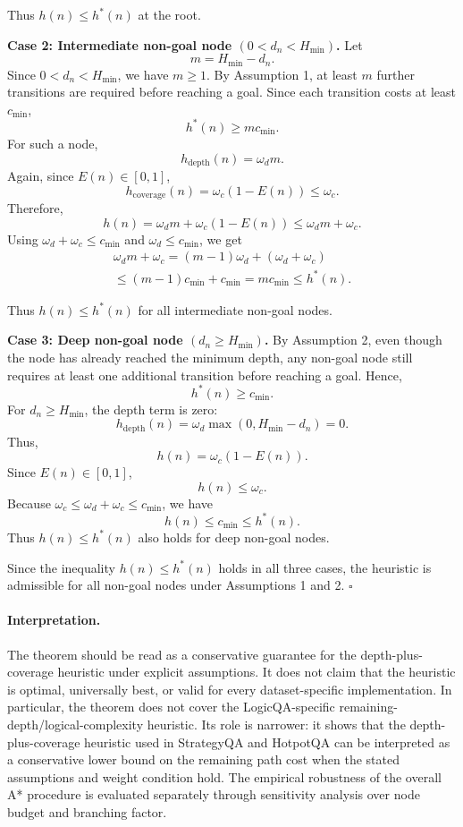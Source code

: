 \documentclass[10pt]{article}
\begin{document}
Thus \(h(n)\leq h^*(n)\) at the root.

\textbf{Case 2: Intermediate non-goal node \((0<d_n<H_{\min})\).}
Let
\[
m = H_{\min}-d_n.
\]
Since \(0<d_n<H_{\min}\), we have \(m\geq 1\). By Assumption 1, at least \(m\) further transitions are required before reaching a goal. Since each transition costs at least \(c_{\min}\),
\[
h^*(n) \geq m c_{\min}.
\]
For such a node,
\[
h_{\mathrm{depth}}(n)=\omega_d m.
\]
Again, since \(E(n)\in[0,1]\),
\[
h_{\mathrm{coverage}}(n)=\omega_c(1-E(n))\leq \omega_c.
\]
Therefore,
\[
h(n)=\omega_d m+\omega_c(1-E(n))
\leq \omega_d m+\omega_c.
\]
Using \(\omega_d+\omega_c\leq c_{\min}\) and \(\omega_d\leq c_{\min}\), we get
\begin{multline}
    \omega_d m+\omega_c
= (m-1)\omega_d+(\omega_d+\omega_c) \\
\leq (m-1)c_{\min}+c_{\min}
= m c_{\min}
\leq h^*(n).
\end{multline}


Thus \(h(n)\leq h^*(n)\) for all intermediate non-goal nodes.

\textbf{Case 3: Deep non-goal node \((d_n\geq H_{\min})\).}
By Assumption 2, even though the node has already reached the minimum depth, any non-goal node still requires at least one additional transition before reaching a goal. Hence,
\[
h^*(n)\geq c_{\min}.
\]
For \(d_n\geq H_{\min}\), the depth term is zero:
\[
h_{\mathrm{depth}}(n)=\omega_d\max(0,H_{\min}-d_n)=0.
\]
Thus,
\[
h(n)=\omega_c(1-E(n)).
\]
Since \(E(n)\in[0,1]\),
\[
h(n)\leq \omega_c.
\]
Because \(\omega_c\leq \omega_d+\omega_c\leq c_{\min}\), we have
\[
h(n)\leq c_{\min}\leq h^*(n).
\]
Thus \(h(n)\leq h^*(n)\) also holds for deep non-goal nodes.

Since the inequality \(h(n)\leq h^*(n)\) holds in all three cases, the heuristic is admissible for all non-goal nodes under Assumptions 1 and 2.
\(\square\)

\paragraph{Interpretation.}
The theorem should be read as a conservative guarantee for the depth-plus-coverage heuristic under explicit assumptions. It does not claim that the heuristic is optimal, universally best, or valid for every dataset-specific implementation. In particular, the theorem does not cover the LogicQA-specific remaining-depth/logical-complexity heuristic. Its role is narrower: it shows that the depth-plus-coverage heuristic used in StrategyQA and HotpotQA can be interpreted as a conservative lower bound on the remaining path cost when the stated assumptions and weight condition hold. The empirical robustness of the overall A* procedure is evaluated separately through sensitivity analysis over node budget and branching factor.
\end{document}
